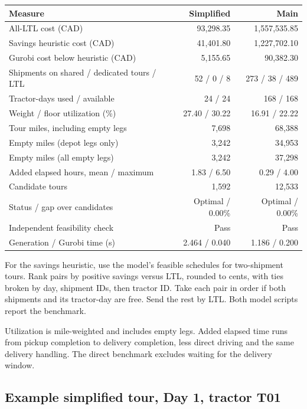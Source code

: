 \documentclass[11pt,letterpaper]{article}
\begin{document}
\begin{center}
\small
\begin{tabularx}{\linewidth}{@{}Yrr@{}}
\toprule
Measure & Simplified & Main\\
\midrule
All-LTL cost (CAD) & 93,298.35 & 1,557,535.85\\
Savings heuristic cost (CAD) & 41,401.80 & 1,227,702.10\\
Gurobi cost below heuristic (CAD) & 5,155.65 & 90,382.30\\
Shipments on shared / dedicated tours / LTL & 52 / 0 / 8 & 273 / 38 / 489\\
Tractor-days used / available & 24 / 24 & 168 / 168\\
Weight / floor utilization (\%) & 27.40 / 30.22 & 16.91 / 22.22\\
Tour miles, including empty legs & 7,698 & 68,388\\
Empty miles (depot legs only) & 3,242 & 34,953\\
Empty miles (all empty legs) & 3,242 & 37,298\\
Added elapsed hours, mean / maximum & 1.83 / 6.50 & 0.29 / 4.00\\
Candidate tours & 1,592 & 12,533\\
Status / gap over candidates & Optimal / 0.00\% & Optimal / 0.00\%\\
Independent feasibility check & Pass & Pass\\
Generation / Gurobi time (s) & 2.464 / 0.040 & 1.186 / 0.200\\
\bottomrule
\end{tabularx}
\end{center}

For the savings heuristic, use the model's feasible schedules for
two-shipment tours. Rank pairs by positive savings versus LTL, rounded
to cents, with ties broken by day, shipment IDs, then tractor ID. Take
each pair in order if both shipments and its tractor-day are free. Send
the rest by LTL. Both model scripts report the benchmark.

Utilization is mile-weighted and includes empty legs. Added elapsed
time runs from pickup completion to delivery completion, less direct
driving and the same delivery handling. The direct benchmark excludes
waiting for the delivery window.

\subsection*{Example simplified tour, Day 1, tractor T01}
\end{document}

